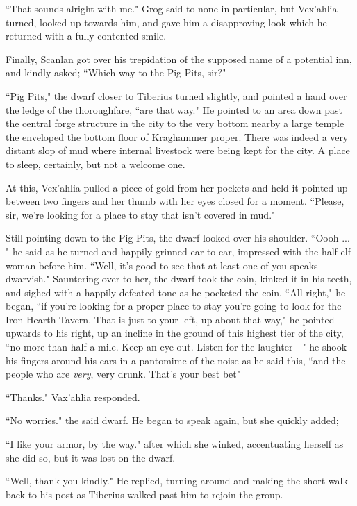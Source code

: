 ``That sounds alright with me." Grog said to none in particular, but Vex'ahlia turned, looked up towards him, and gave him a disapproving look which he returned with a fully contented smile.

Finally, Scanlan got over his trepidation of the supposed name of a potential inn, and kindly asked; ``Which way to the Pig Pits, sir?"

``Pig Pits," the dwarf closer to Tiberius turned slightly, and pointed a hand over the ledge of the thoroughfare, ``are that way." He pointed to an area down past the central forge structure in the city to the very bottom nearby a large temple the enveloped the bottom floor of Kraghammer proper. There was indeed a very distant slop of mud where internal livestock were being kept for the city. A place to sleep, certainly, but not a welcome one.

At this, Vex'ahlia pulled a piece of gold from her pockets and held it pointed up between two fingers and her thumb with her eyes closed for a moment. ``Please, sir, we're looking for a place to stay that isn't covered in mud."

Still pointing down to the Pig Pits, the dwarf looked over his shoulder. ``Oooh ... " he said as he turned and happily grinned ear to ear, impressed with the half-elf woman before him. ``Well, it's good to see that at least one of you speaks dwarvish." Sauntering over to her, the dwarf took the coin, kinked it in his teeth, and sighed with a happily defeated tone as he pocketed the coin. ``All right," he began, ``if you're looking for a proper place to stay you're going to look for the Iron Hearth Tavern. That is just to your left, up about that way," he pointed upwards to his right, up an incline in the ground of this highest tier of the city, ``no more than half a mile. Keep an eye out. Listen for the laughter---" he shook his fingers around his ears in a pantomime of the noise as he said this, ``and the people who are \textit{very}, very drunk. That's your best bet"

``Thanks." Vax'ahlia responded.

``No worries." the said dwarf. He began to speak again, but she quickly added;

``I like your armor, by the way." after which she winked, accentuating herself as she did so, but it was lost on the dwarf.

``Well, thank you kindly." He replied, turning around and making the short walk back to his post as Tiberius walked past him to rejoin the group.

